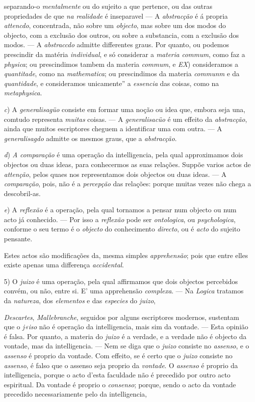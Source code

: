 separando-o \emph{mentalmente} ou do sujeito a que pertence, ou das outras propriedades de que \emph{na realidade} é inseparavel --- A \emph{abstracção} é á propria \emph{attencdo}, concentrada, não sobre um \emph{objecto}, mas sobre um dos modos do objecto, com a exclusão dos outros, ou sobre a substancia, com a exclusão dos modos. --- A \emph{abstraccdo} admitte differentes graus. Por quanto, ou podemos prescindir da matéria \emph{individual}, e só considerar a \emph{materia commum}, como faz a \emph{physica}; ou prescindimos tambem da materia \emph{commum}, e \emph{EX}) consideramos a \emph{quantitade}, como na \emph{mathematica}; ou prescindimos da materia \emph{communm} e da \emph{quantidade}, e consideramos unicamente” a \emph{essencia} das coisas, como na \emph{metaphysica}.\par \emph{c}) A \emph{generalisagüo} consiste em formar uma noção ou idea que, embora seja una, comtudo representa \emph{muitas} coisas. --- A \emph{generalisacüo} é um effeito da \emph{abstracção}, ainda que muitos escriptores cheguem a identificar uma com outra. --- A \emph{generalisagdo} admitte os mesmos graus, que a \emph{abstracção}.\par \emph{d}) \emph{A comparação} é uma operação da intelligencia, pela qual approximamos dois objectos ou duas ideas, para conhecermos as suas relações. Suppõe varios actos de \emph{attenção}, pelos quaes nos representamos dois objectos ou duas ideas. --- A \emph{comparação}, pois, não é a \emph{percepção} das relações: porque muitas vezes não chega a descobril-as.\par \emph{e}) A \emph{reflexão} é a operação, pela qual tornamos a pensar num objecto ou num acto já conhecido. --- Por isso a \emph{reflexão} pode ser \emph{ontologica}, ou \emph{psychologica}, conforme o seu termo é o \emph{objecto} do conhecimento \emph{directo}, ou é \emph{acto} do sujeito pensante.\par Estes actos são modificações da, mesma simples \emph{apprehensão}; pois que entre elles existe apenas uma differença \emph{accidental}.\par 5) O \emph{juizo} é uma operação, pela qual affirmamos que dois objectos percebidos convém, ou não, entre si. E' uma apprehensão \emph{complexa}. --- Na \emph{Logica} tratamos da \emph{natureza}, dos \emph{elementos} e das \emph{especies} do \emph{juizo},\par \emph{Descartes}, \emph{Mallebranche}, seguidos por alguns escriptores modernos, sustentam que o \emph{j«iso} não é operação da intelligencia, mais sim da vontade. --- Esta opinião é falsa. Por quanto, a materia do \emph{juizo} é a verdade, e a verdade não é objecto da vontade, mas da intelligencia. --- Nem se diga que o \emph{juizo} consiste no \emph{assenso}, e o \emph{assenso} é proprio da vontade. Com effeito, se é certo que o \emph{juizo} consiste no \emph{assenso}, é falso que o assenso seja proprio da \emph{vontade}. O \emph{assenso} é proprio da intelligencia, porque o acto d'esta faculdade não é precedido por outro acto espiritual. Da vontade é proprio o \emph{consenso}; porque, sendo o acto da vontade precedido necessariamente pelo da intelligencia, 
